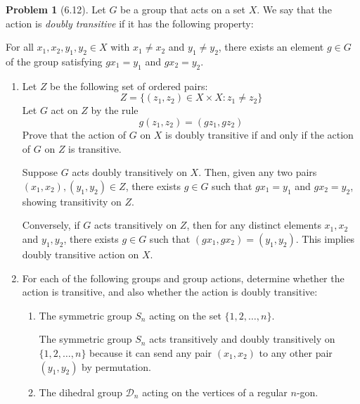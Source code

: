 \documentclass[12pt]{article}
\theoremstyle{definition}
\newtheorem{problem}{Problem}
\begin{document}
\begin{problem}[6.12]
    Let $G$ be a group that acts on a set $X$. We say that the action is \textit{doubly transitive} if it has the following property:
    
    For all $x_1, x_2, y_1, y_2 \in X$ with $x_1 \neq x_2$ and $y_1 \neq y_2$, there exists an element $g \in G$ of the group satisfying $gx_1 = y_1$ and $gx_2 = y_2$.
    \begin{enumerate}[label=(\alph*)]
        \item Let $Z$ be the following set of ordered pairs:
              \[
                  Z = \{ (z_1, z_2) \in X \times X : z_1 \neq z_2 \}
              \]
              Let $G$ act on $Z$ by the rule
              \[
                  g(z_1, z_2) = (gz_1, gz_2)
              \]
              Prove that the action of $G$ on $X$ is doubly transitive if and only if the action of $G$ on $Z$ is transitive.
              
              \begin{solution}
                  Suppose $G$ acts doubly transitively on $X$. Then, given any two pairs $(x_1, x_2), (y_1, y_2) \in Z$, there exists $g \in G$ such that $gx_1 = y_1$ and $gx_2 = y_2$, showing transitivity on $Z$.

                  Conversely, if $G$ acts transitively on $Z$, then for any distinct elements $x_1, x_2$ and $y_1, y_2$, there exists $g \in G$ such that $(gx_1, gx_2) = (y_1, y_2)$. This implies doubly transitive action on $X$. 
              \end{solution}

        \item For each of the following groups and group actions, determine whether the action is transitive, and also whether the action is doubly transitive:
              \begin{enumerate}[label=(\arabic*)]
                  \item The symmetric group $S_n$ acting on the set $\{1, 2, \ldots, n\}$.
                        
                        \begin{solution}
                            The symmetric group $S_n$ acts transitively and doubly transitively on $\{1,2,\dots,n\}$ because it can send any pair $(x_1, x_2)$ to any other pair $(y_1, y_2)$ by permutation. 
                        \end{solution}
                  \item The dihedral group $\mathcal{D}_n$ acting on the vertices of a regular $n$-gon.
                  

\end{enumerate}
\end{enumerate}
\end{problem}
\end{document}
